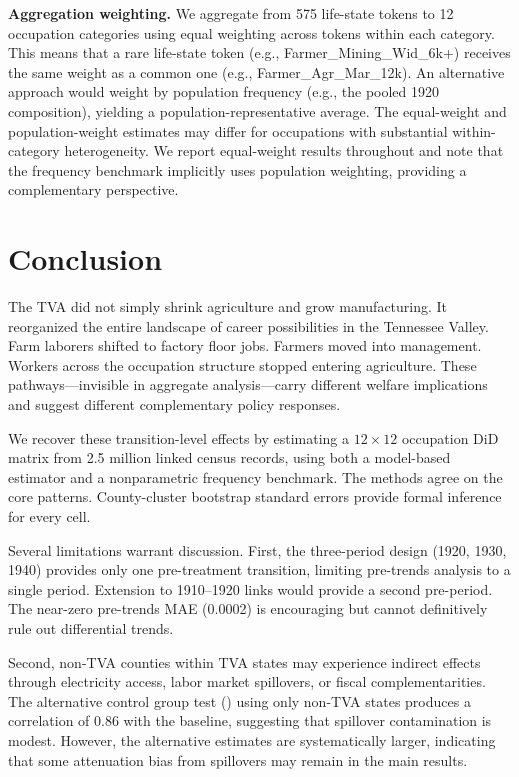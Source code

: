 \documentclass[12pt]{article}
\begin{document}
\textbf{Aggregation weighting.} We aggregate from 575 life-state tokens to 12 occupation categories using equal weighting across tokens within each category. This means that a rare life-state token (e.g., Farmer\_Mining\_Wid\_6k+) receives the same weight as a common one (e.g., Farmer\_Agr\_Mar\_12k). An alternative approach would weight by population frequency (e.g., the pooled 1920 composition), yielding a population-representative average. The equal-weight and population-weight estimates may differ for occupations with substantial within-category heterogeneity. We report equal-weight results throughout and note that the frequency benchmark implicitly uses population weighting, providing a complementary perspective.


\section{Conclusion}
\label{sec:conclusion}

The TVA did not simply shrink agriculture and grow manufacturing. It reorganized the entire landscape of career possibilities in the Tennessee Valley. Farm laborers shifted to factory floor jobs. Farmers moved into management. Workers across the occupation structure stopped entering agriculture. These pathways---invisible in aggregate analysis---carry different welfare implications and suggest different complementary policy responses.

We recover these transition-level effects by estimating a $12 \times 12$ occupation DiD matrix from 2.5 million linked census records, using both a model-based estimator and a nonparametric frequency benchmark. The methods agree on the core patterns. County-cluster bootstrap standard errors provide formal inference for every cell.

Several limitations warrant discussion. First, the three-period design (1920, 1930, 1940) provides only one pre-treatment transition, limiting pre-trends analysis to a single period. Extension to 1910--1920 links would provide a second pre-period. The near-zero pre-trends MAE (0.0002) is encouraging but cannot definitively rule out differential trends.

Second, non-TVA counties within TVA states may experience indirect effects through electricity access, labor market spillovers, or fiscal complementarities. The alternative control group test () using only non-TVA states produces a correlation of 0.86 with the baseline, suggesting that spillover contamination is modest. However, the alternative estimates are systematically larger, indicating that some attenuation bias from spillovers may remain in the main results.
\end{document}
